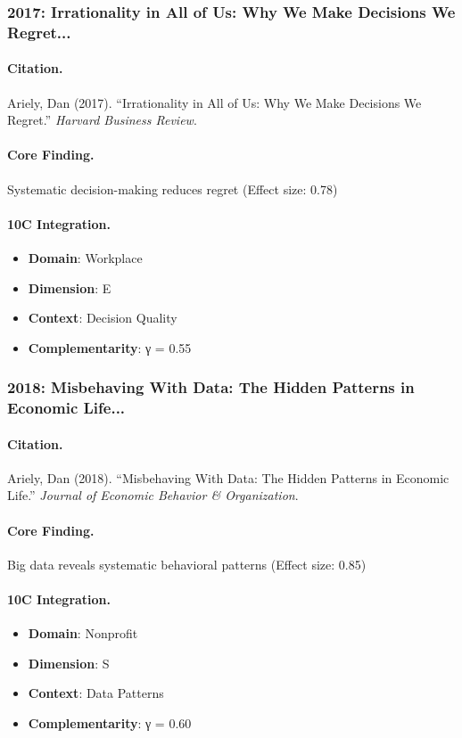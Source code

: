 \subsubsection{2017: Irrationality in All of Us: Why We Make Decisions We Regret...}

\paragraph{Citation.}
Ariely, Dan (2017). ``Irrationality in All of Us: Why We Make Decisions We Regret.''
\textit{Harvard Business Review}.

\paragraph{Core Finding.}
Systematic decision-making reduces regret (Effect size: 0.78)

\paragraph{10C Integration.}
\begin{itemize}[nosep]
  \item \textbf{Domain}: Workplace
  \item \textbf{Dimension}: E
  \item \textbf{Context}: Decision Quality
  \item \textbf{Complementarity}: γ = 0.55
\end{itemize}

\subsubsection{2018: Misbeha­ving With Data: The Hidden Patterns in Economic Life...}

\paragraph{Citation.}
Ariely, Dan (2018). ``Misbeha­ving With Data: The Hidden Patterns in Economic Life.''
\textit{Journal of Economic Behavior & Organization}.

\paragraph{Core Finding.}
Big data reveals systematic behavioral patterns (Effect size: 0.85)

\paragraph{10C Integration.}
\begin{itemize}[nosep]
  \item \textbf{Domain}: Nonprofit
  \item \textbf{Dimension}: S
  \item \textbf{Context}: Data Patterns
  \item \textbf{Complementarity}: γ = 0.60
\end{itemize}

